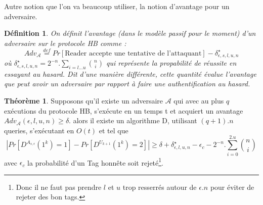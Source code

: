 \documentclass{article}		%
\newtheorem{defi}{Définition}
\theoremstyle{definition}
\newtheorem{theo}{Théorème}
\theoremstyle{plain}
\theoremstyle{plain}
\theoremstyle{plain}
\theoremstyle{plain}
\theoremstyle{plain}
\begin{document}
\begin{framed}
Autre notion que l'on va beaucoup utiliser, la notion d'avantage pour un
adversaire.
\begin{defi}
On définit l'avantage (dans le modèle passif pour le moment) d'un adversaire sur le
protocole HB comme : 
$$Adv_{\mathcal{A}} \stackrel{def}{=} Pr[\text{Reader accepte une
tentative de l'attaquant}]-\delta^{\star}_{\epsilon,s,l,u,n}$$
où
$\delta^{\star}_{\epsilon,s,l,u,n}=2^{-n}.\sum\limits_{i=l \dots
u}\binom{n}{i}$ qui représente la propabilité de réussite en essayant au
hasard. Dit d'une manière différente, cette quantité évalue
l'\emph{avantage} que peut avoir un adversaire par rapport à faire une
authentification au hasard.
\end{defi}
\end{framed}
\begin{theo}
Supposons qu'il existe un adversaire $\mathcal{A}$ qui avec au plus $q$
exécutions du protocole HB, s'exécute en un temps t et acquiert un
avantage $Adv_{\mathcal{A}}(\epsilon,l,u,n)\geq \delta$. alors il existe
un algorithme D, utilisant $(q+1).n$ queries, s'exécutant en $O(t)$ et
tel que 
$$|Pr[D^{A_{s,\epsilon}}(1^k)=1]-Pr[D^{U_{k+1}}(1^k)=2]|\geq \delta +
\delta^{\star}_{\epsilon,l,u,n}-\epsilon_c-2^{-n}.\sum_{i=0}^{2.u}
\binom{n}{i}$$
avec $\epsilon_c$ la probabilité d'un Tag honnête soit
rejeté\footnote{Donc
il ne faut pas prendre $l$ et $u$ trop resserrés autour de $\epsilon.n$ pour éviter
de rejeter des bon tags.}.
\end{theo}
\end{document}
